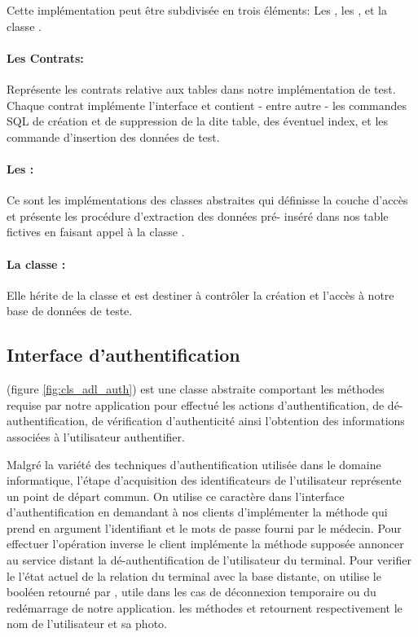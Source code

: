 Cette implémentation peut être subdivisée en trois éléments: Les , les , et la classe .

\paragraph{Les Contrats:}

Représente les contrats relative aux tables dans notre implémentation de
test. Chaque contrat implémente l'interface
 et contient - entre autre - les
commandes SQL de création et de suppression de la dite table, des
éventuel index, et les commande d'insertion des données de test.

\paragraph{Les :} 

Ce sont les implémentations des classes abstraites qui définisse la
couche d’accès et présente les procédure d'extraction des données pré-
inséré dans nos table fictives en faisant appel à la classe
 .

\paragraph[La classe \dev{DBSetup}:]{La classe :} 

Elle hérite de la classe  et est destiner à
contrôler la création et l’accès à notre base de données de teste.

\subsection{Interface d'authentification}

 (figure
\ref{fig:cls_adl_auth}) est une classe abstraite comportant les méthodes
requise par notre application pour effectué les actions
d'authentification, de dé-authentification, de vérification
d'authenticité ainsi l'obtention des informations associées à l'utilisateur
authentifier.

Malgré la variété des techniques d'authentification utilisée dans le
domaine informatique, l'étape d'acquisition des identificateurs de
l'utilisateur représente un point de départ commun. On utilise ce
caractère dans l'interface d'authentification en demandant à nos clients
d'implémenter la méthode  qui prend en argument
l'identifiant et le mots de passe fourni par le médecin. Pour effectuer
l’opération inverse le client implémente la méthode 
supposée annoncer au service distant la dé-authentification de
l'utilisateur du terminal. Pour verifier le l'état actuel de la relation
du terminal avec la base distante, on utilise le booléen retourné par
, utile dans les cas de déconnexion temporaire ou du
redémarrage de notre application. les méthodes  et
 retournent respectivement le nom de l'utilisateur et sa
photo.

